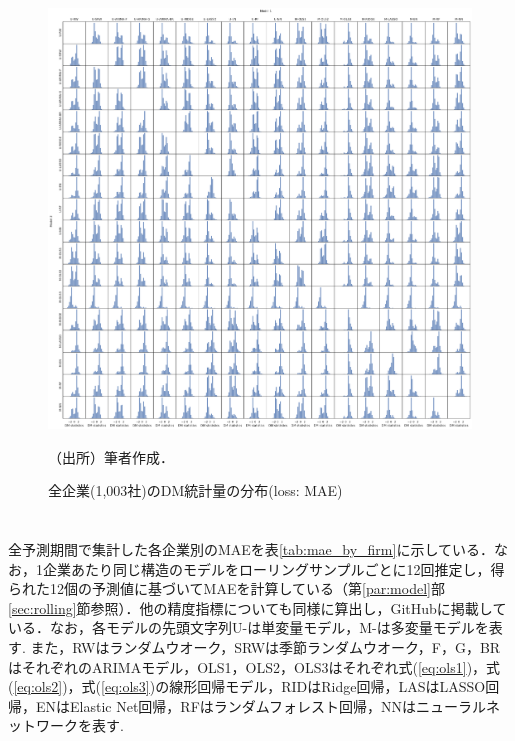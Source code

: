 \documentclass[a4paper，11pt]{jsarticle}
\begin{document}
\begin{figure}[hbtp]
  \centering
  \caption{全企業(1,003社)のDM統計量の分布(loss: MAE)}
  \label{fig:dm_all}
  \includegraphics[width=\linewidth]{./img/_dm_mat_MAE.pdf}
  \begin{threeparttable}
  \begin{tablenotes}
    \item[]（出所）筆者作成．
  \end{tablenotes}
  \end{threeparttable}  
\end{figure}

\newpage
\section{} \label{app:acc_by_firm}
全予測期間で集計した各企業別のMAEを表\ref{tab:mae_by_firm}に示している．なお，1企業あたり同じ構造のモデルをローリングサンプルごとに12回推定し，得られた12個の予測値に基づいてMAEを計算している（第\ref{par:model}部\ref{sec:rolling}節参照）．他の精度指標についても同様に算出し，GitHubに掲載している．なお，各モデルの先頭文字列U-は単変量モデル，M-は多変量モデルを表す. また，RWはランダムウオーク，SRWは季節ランダムウオーク，F，G，BRはそれぞれ\cite*{foster1977quarterly, griffin1977time, brown1979univariate}のARIMAモデル，OLS1，OLS2，OLS3はそれぞれ式(\ref{eq:ols1})，式(\ref{eq:ols2})，式(\ref{eq:ols3})の線形回帰モデル，RIDはRidge回帰，LASはLASSO回帰，ENはElastic Net回帰，RFはランダムフォレスト回帰，NNはニューラルネットワークを表す.


\end{document}
